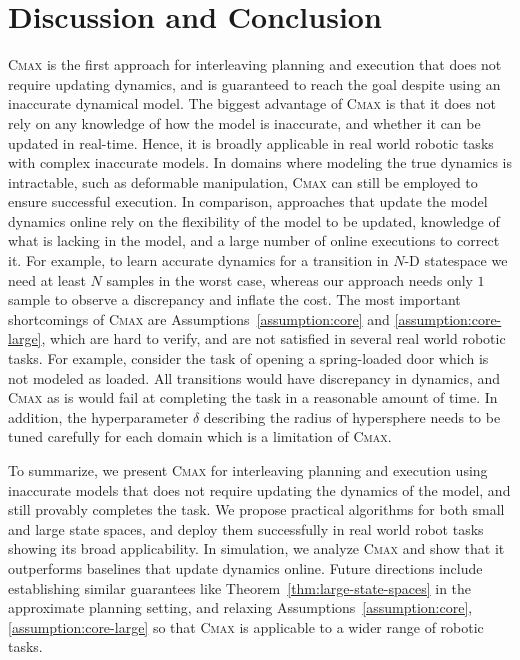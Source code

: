 \section{Discussion and Conclusion}
\label{sec:discussion}
\textsc{Cmax} is the first approach for interleaving planning and
execution that does not require updating 
dynamics, and is guaranteed to reach the goal despite
using an inaccurate dynamical model.
The biggest advantage of \textsc{Cmax} is
that it does not rely on any knowledge of how the model is inaccurate, and
whether it can be updated in real-time.
Hence, it
is broadly applicable in real world robotic tasks with complex inaccurate
models.
In domains where modeling the true dynamics is
intractable, such as deformable manipulation, \textsc{Cmax} can still
be employed to ensure successful execution.
In comparison, approaches that update the model dynamics
online rely on the flexibility of the model to be updated, knowledge
of what is lacking in the model, and a large number of online
executions to correct it. For example, to learn accurate dynamics for a transition
in $N$-D statespace we need at least $N$ samples in the worst case,
whereas our approach needs only $1$ sample to observe a discrepancy
and inflate the cost. The most important shortcomings of \textsc{Cmax}
are
Assumptions~\ref{assumption:core} and \ref{assumption:core-large},
which are hard to verify, and are not satisfied in several real world
robotic
tasks. For
example, consider the task of opening a spring-loaded door 
which is not modeled as loaded. All transitions would have discrepancy in
dynamics, and \textsc{Cmax} as is would fail at completing the task
in a reasonable amount of time. In addition, the hyperparameter
$\delta$ describing the radius of hypersphere needs to be
tuned carefully for each domain which is a limitation of \textsc{Cmax}.

To summarize, we present \textsc{Cmax} for interleaving planning
and execution using inaccurate models that does not require updating
the dynamics of the model, and still provably completes the task. We
propose practical algorithms for both small and large state spaces,
and deploy them successfully in real world robot tasks showing its broad
applicability. In simulation, we 
analyze \textsc{Cmax} and show that it outperforms baselines that
update dynamics online. Future directions include establishing
similar guarantees like Theorem~\ref{thm:large-state-spaces} in the
approximate planning setting, and relaxing
Assumptions~\ref{assumption:core}, \ref{assumption:core-large} so that
\textsc{Cmax} is applicable to a wider range of robotic tasks.

